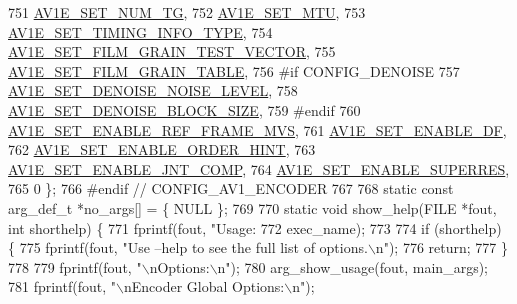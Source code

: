 \begin{DoxyCodeInclude}
{{{{{{{751     \hyperlink{group__aom__encoder_ggae78dde67a6d78f332e9bdba0dde42db5a9ac0044ad63e6848a482db04f0858c44}{AV1E\_SET\_NUM\_TG},
752     \hyperlink{group__aom__encoder_ggae78dde67a6d78f332e9bdba0dde42db5a353037d84b6c47ac0138fa843b70a2bb}{AV1E\_SET\_MTU},
753     \hyperlink{group__aom__encoder_ggae78dde67a6d78f332e9bdba0dde42db5a857e822046c62a4c774b1d16c4e453dd}{AV1E\_SET\_TIMING\_INFO\_TYPE},
754     \hyperlink{group__aom__encoder_ggae78dde67a6d78f332e9bdba0dde42db5a437e6b282a2395b4b08a9acde3e41cfb}{AV1E\_SET\_FILM\_GRAIN\_TEST\_VECTOR},
755     \hyperlink{group__aom__encoder_ggae78dde67a6d78f332e9bdba0dde42db5ad5846c6f49d37e65a03c39e68d487097}{AV1E\_SET\_FILM\_GRAIN\_TABLE},
756 \textcolor{preprocessor}{#if CONFIG\_DENOISE}
757     \hyperlink{group__aom__encoder_ggae78dde67a6d78f332e9bdba0dde42db5a54fe460f126a7566aa627cd82826faf0}{AV1E\_SET\_DENOISE\_NOISE\_LEVEL},
758     \hyperlink{group__aom__encoder_ggae78dde67a6d78f332e9bdba0dde42db5ae113c7e68a6c39b872a268ed6cdf6d10}{AV1E\_SET\_DENOISE\_BLOCK\_SIZE},
759 \textcolor{preprocessor}{#endif}
760     \hyperlink{group__aom__encoder_ggae78dde67a6d78f332e9bdba0dde42db5a5e82346d8463bf758967abb0d03ebc88}{AV1E\_SET\_ENABLE\_REF\_FRAME\_MVS},
761     \hyperlink{group__aom__encoder_ggae78dde67a6d78f332e9bdba0dde42db5ab2a89e85539e97b96e057cb063063c86}{AV1E\_SET\_ENABLE\_DF},
762     \hyperlink{group__aom__encoder_ggae78dde67a6d78f332e9bdba0dde42db5ad0eaf349d653c8357acbba84ad95d5e6}{AV1E\_SET\_ENABLE\_ORDER\_HINT},
763     \hyperlink{group__aom__encoder_ggae78dde67a6d78f332e9bdba0dde42db5ac5c0c60dc1b709c082da28feae3bcad3}{AV1E\_SET\_ENABLE\_JNT\_COMP},
764     \hyperlink{group__aom__encoder_ggae78dde67a6d78f332e9bdba0dde42db5a86e399de03aa825bb7e594e3df1bf71b}{AV1E\_SET\_ENABLE\_SUPERRES},
765     0 \};
766 \textcolor{preprocessor}{#endif  // CONFIG\_AV1\_ENCODER}
767 
768 \textcolor{keyword}{static} \textcolor{keyword}{const} arg\_def\_t *no\_args[] = \{ NULL \};
769 
770 \textcolor{keyword}{static} \textcolor{keywordtype}{void} show\_help(FILE *fout, \textcolor{keywordtype}{int} shorthelp) \{
771   fprintf(fout, \textcolor{stringliteral}{"Usage: %
772       exec\_name);
773 
774   \textcolor{keywordflow}{if} (shorthelp) \{
775     fprintf(fout, \textcolor{stringliteral}{"Use --help to see the full list of options.\(\backslash\)n"});
776     \textcolor{keywordflow}{return};
777   \}
778 
779   fprintf(fout, \textcolor{stringliteral}{"\(\backslash\)nOptions:\(\backslash\)n"});
780   arg\_show\_usage(fout, main\_args);
781   fprintf(fout, \textcolor{stringliteral}{"\(\backslash\)nEncoder Global Options:\(\backslash\)n"});
}}}}}}}}
\end{DoxyCodeInclude}
